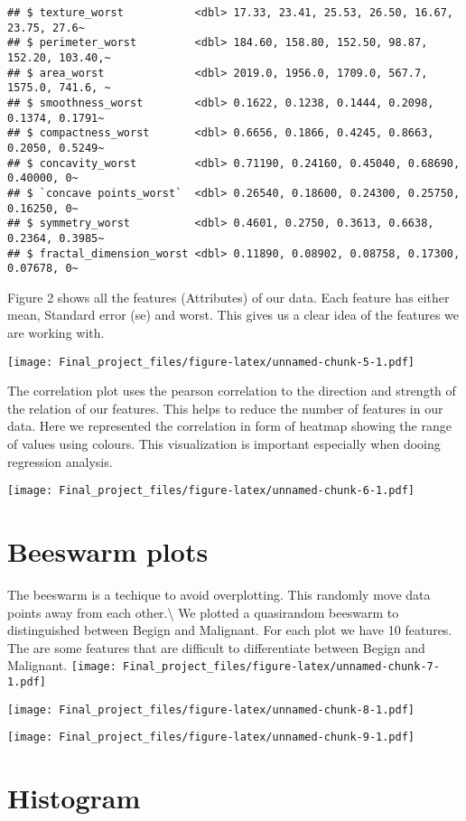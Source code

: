 \documentclass[
]{article}
\begin{document}
\begin{verbatim}
## $ texture_worst           <dbl> 17.33, 23.41, 25.53, 26.50, 16.67, 23.75, 27.6~
## $ perimeter_worst         <dbl> 184.60, 158.80, 152.50, 98.87, 152.20, 103.40,~
## $ area_worst              <dbl> 2019.0, 1956.0, 1709.0, 567.7, 1575.0, 741.6, ~
## $ smoothness_worst        <dbl> 0.1622, 0.1238, 0.1444, 0.2098, 0.1374, 0.1791~
## $ compactness_worst       <dbl> 0.6656, 0.1866, 0.4245, 0.8663, 0.2050, 0.5249~
## $ concavity_worst         <dbl> 0.71190, 0.24160, 0.45040, 0.68690, 0.40000, 0~
## $ `concave points_worst`  <dbl> 0.26540, 0.18600, 0.24300, 0.25750, 0.16250, 0~
## $ symmetry_worst          <dbl> 0.4601, 0.2750, 0.3613, 0.6638, 0.2364, 0.3985~
## $ fractal_dimension_worst <dbl> 0.11890, 0.08902, 0.08758, 0.17300, 0.07678, 0~
\end{verbatim}

Figure 2 shows all the features (Attributes) of our data. Each feature
has either mean, Standard error (se) and worst. This gives us a clear
idea of the features we are working with.

\texttt{[image: Final\_project\_files/figure-latex/unnamed-chunk-5-1.pdf]}

The correlation plot uses the pearson correlation to the direction and
strength of the relation of our features. This helps to reduce the
number of features in our data. Here we represented the correlation in
form of heatmap showing the range of values using colours. This
visualization is important especially when dooing regression analysis.

\texttt{[image: Final\_project\_files/figure-latex/unnamed-chunk-6-1.pdf]}

\section{Beeswarm plots}

The beeswarm is a techique to avoid overplotting. This randomly move
data points away from each other.\textbackslash{} We plotted a
quasirandom beeswarm to distinguished between Begign and Malignant. For
each plot we have 10 features. The are some features that are difficult
to differentiate between Begign and Malignant.
\texttt{[image: Final\_project\_files/figure-latex/unnamed-chunk-7-1.pdf]}

\texttt{[image: Final\_project\_files/figure-latex/unnamed-chunk-8-1.pdf]}

\texttt{[image: Final\_project\_files/figure-latex/unnamed-chunk-9-1.pdf]}

\section{Histogram}
\end{document}
